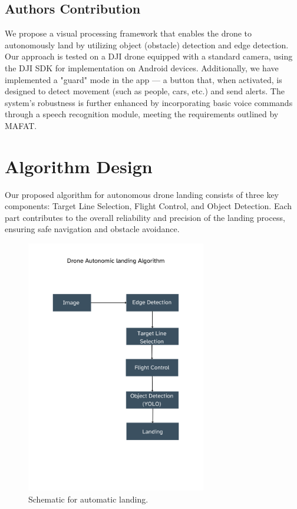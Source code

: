 \documentclass[3p,times]{elsarticle}
\begin{document}
\subsection{Authors Contribution}
We propose a visual processing framework that enables the drone to autonomously land by utilizing object (obstacle) detection and edge detection. Our approach is tested on a DJI drone equipped with a standard camera, using the DJI SDK for implementation on Android devices. Additionally, we have implemented a "guard" mode in the app — a button that, when activated, is designed to detect movement (such as people, cars, etc.) and send alerts. The system's robustness is further enhanced by incorporating basic voice commands through a speech recognition module, meeting the requirements outlined by MAFAT.\\

\newpage \section{Algorithm Design} \label{sec:algorithm}
Our proposed algorithm for autonomous drone landing consists of three key components: Target Line Selection, Flight Control, and Object Detection. Each part contributes to the overall reliability and precision of the landing process, ensuring safe navigation and obstacle avoidance.

\begin{figure}[H]
    \centering
    \includegraphics[width=0.7\textwidth]{Schematic_for_automatic_landing.png}  %
    \caption{Schematic for automatic landing.}
    \label{fig:Schematic_for_automatic_landing.}
\end{figure}
\end{document}
